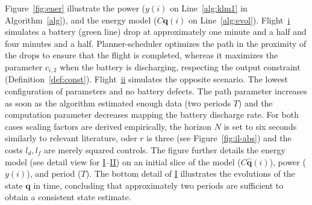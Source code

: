 \documentclass[letterpaper,10pt,journal,twoside]{IEEEtran}
\theoremstyle{definition}
\begin{document}
Figure~\ref{fig:ener} %
illustrate the power ($y(i)$ on Line~\ref{alg:klm1} in Algorithm~\ref{alg}), and the energy model ($C\mathbf{q}(i)$ on Line~\ref{alg:evol}).
Flight~\hyperref[fig:ener-dyn-i]{i} simulates a battery (green line) drop at approximately one minute and a half and four minutes and a half. Planner-scheduler optimizes the path in the proximity of the drops to ensure that the flight is completed, whereas it maximizes the parameter $c_{i,2}$ when the battery is discharging, respecting the output constraint (Definition~\ref{def:const}). Flight~\hyperref[fig:ener-dyn-ii]{ii} simulates the opposite scenario. The lowest configuration of parameters and no battery defects. The path parameter increases as soon as the algorithm estimated enough data (two periods $T$) and the computation parameter decreases mapping the battery discharge rate. For both cases scaling factors are derived empirically, the horizon $N$ is set to six seconds similarly to relevant literature, oder $r$ is three (see Figure~\ref{fig:il-abs}) and the costs $l_d,l_f$ are merely squared controls.
The figure further details the energy model (see detail view for \hyperref[fig:ener:static-I]{I}--\hyperref[fig:ener:static-II]{II}) on an initial slice of the model ($C\hat{\mathbf{q}}(i)$), power ($y(i)$), and period ($T$).%
The bottom detail of \hyperref[fig:ener:static-I]{I} illustrates the evolutions of the state $\mathbf{q}$ in time, concluding that approximately two periods are sufficient to obtain a consistent state estimate. %

\end{document}
